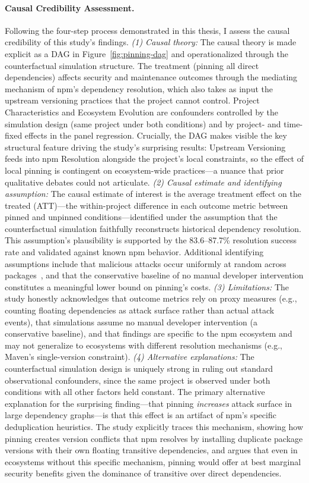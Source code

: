 \paragraph{Causal Credibility Assessment.}
Following the four-step process demonstrated in this thesis, I assess the causal credibility of this study's findings.
\emph{(1) Causal theory:} The causal theory is made explicit as a DAG in Figure~\ref{fig:pinning-dag} and operationalized through the counterfactual simulation structure.
The treatment (pinning all direct dependencies) affects security and maintenance outcomes through the mediating mechanism of npm's dependency resolution, which also takes as input the upstream versioning practices that the project cannot control.
Project Characteristics and Ecosystem Evolution are confounders controlled by the simulation design (same project under both conditions) and by project- and time-fixed effects in the panel regression.
Crucially, the DAG makes visible the key structural feature driving the study's surprising results: Upstream Versioning feeds into npm Resolution alongside the project's local constraints, so the effect of local pinning is contingent on ecosystem-wide practices---a nuance that prior qualitative debates could not articulate.
\emph{(2) Causal estimate and identifying assumption:} The causal estimate of interest is the average treatment effect on the treated (ATT)---the within-project difference in each outcome metric between pinned and unpinned conditions---identified under the assumption that the counterfactual simulation faithfully reconstructs historical dependency resolution.
This assumption's plausibility is supported by the 83.6--87.7\% resolution success rate and validated against known npm behavior.
Additional identifying assumptions include that malicious attacks occur uniformly at random across packages~\cite{DBLP:conf/dimva/OhmPS020}, and that the conservative baseline of no manual developer intervention constitutes a meaningful lower bound on pinning's costs.
\emph{(3) Limitations:} The study honestly acknowledges that outcome metrics rely on proxy measures (e.g., counting floating dependencies as attack surface rather than actual attack events), that simulations assume no manual developer intervention (a conservative baseline), and that findings are specific to the npm ecosystem and may not generalize to ecosystems with different resolution mechanisms (e.g., Maven's single-version constraint).
\emph{(4) Alternative explanations:} The counterfactual simulation design is uniquely strong in ruling out standard observational confounders, since the same project is observed under both conditions with all other factors held constant.
The primary alternative explanation for the surprising finding---that pinning \emph{increases} attack surface in large dependency graphs---is that this effect is an artifact of npm's specific deduplication heuristics.
The study explicitly traces this mechanism, showing how pinning creates version conflicts that npm resolves by installing duplicate package versions with their own floating transitive dependencies, and argues that even in ecosystems without this specific mechanism, pinning would offer at best marginal security benefits given the dominance of transitive over direct dependencies.

